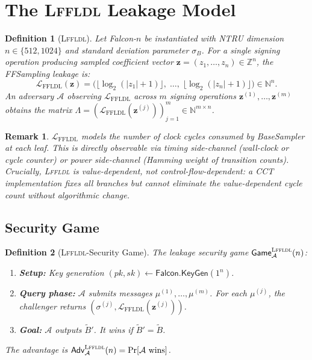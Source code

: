 \documentclass[sigconf,anonymous]{acmart}
\newtheorem{definition}{Definition}
\newtheorem{remark}{Remark}
\begin{document}
\section{The \textsc{Lffldl} Leakage Model}
\label{sec:model}

\begin{definition}[\textsc{Lffldl}]
Let Falcon-$n$ be instantiated with NTRU dimension $n\in\{512,1024\}$ and
standard deviation parameter $\sigma_B$.  For a single signing operation
producing sampled coefficient vector $\mathbf{z}=(z_1,\ldots,z_n)\in\mathbb{Z}^n$,
the FFSampling leakage is:
\[
  \mathcal{L}_{\mathrm{FFLDL}}(\mathbf{z})
  =\bigl(\lfloor\log_2(|z_1|+1)\rfloor,\;\ldots,\;\lfloor\log_2(|z_n|+1)\rfloor\bigr)
  \in\mathbb{N}^n.
\]
An adversary $\mathcal{A}$ observing $\mathcal{L}_{\mathrm{FFLDL}}$ across $m$
signing operations $\mathbf{z}^{(1)},\ldots,\mathbf{z}^{(m)}$ obtains the
matrix $\Lambda=(\mathcal{L}_{\mathrm{FFLDL}}(\mathbf{z}^{(j)}))_{j=1}^m
\in\mathbb{N}^{m\times n}$.
\end{definition}

\begin{remark}
$\mathcal{L}_{\mathrm{FFLDL}}$ models the number of clock cycles consumed by
BaseSampler at each leaf.  This is directly observable via timing side-channel
(wall-clock or cycle counter) or power side-channel (Hamming weight of
transition counts).  Crucially, \textsc{Lffldl} is value-dependent, not
control-flow-dependent: a CCT implementation fixes all branches but cannot
eliminate the value-dependent cycle count without algorithmic change.
\end{remark}

\subsection{Security Game}
\begin{definition}[\textsc{Lffldl}-Security Game]
The leakage security game $\mathsf{Game}^{\textsc{Lffldl}}_{\mathcal{A}}(n)$:
\begin{enumerate}
  \item \textbf{Setup:} Key generation $(pk,sk)\leftarrow\mathsf{Falcon.KeyGen}(1^n)$.
  \item \textbf{Query phase:} $\mathcal{A}$ submits messages
    $\mu^{(1)},\ldots,\mu^{(m)}$.  For each $\mu^{(j)}$, the challenger returns
    $(\sigma^{(j)},\mathcal{L}_{\mathrm{FFLDL}}(\mathbf{z}^{(j)}))$.
  \item \textbf{Goal:} $\mathcal{A}$ outputs $\widetilde{B}'$.  It wins if
    $\widetilde{B}' = \widetilde{B}$.
\end{enumerate}
The advantage is $\mathsf{Adv}^{\textsc{Lffldl}}_{\mathcal{A}}(n) =
\Pr[\mathcal{A}~\text{wins}]$.
\end{definition}
\end{document}
